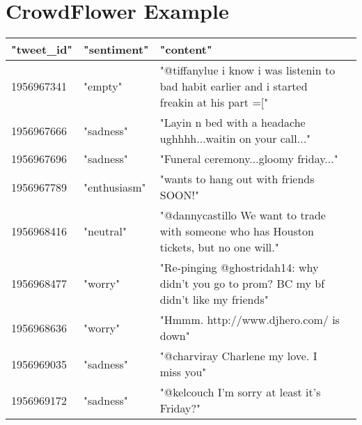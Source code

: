 \section{CrowdFlower Example}\label{sec:CrowdFlower_example}

\begin{landscape}
  \begin{table}
      \centering
      \begin{tabular}{|l|l|l|l}
      \hline
          "tweet_id" & "sentiment" & "content" \\ \hline

          1956967341 & "empty" & "@tiffanylue i know  i was listenin to bad habit earlier and i started freakin at his part =[" \\
          1956967666 & "sadness" & "Layin n bed with a headache  ughhhh...waitin on your call..." \\
          1956967696 & "sadness" & "Funeral ceremony...gloomy friday..." \\
          1956967789 & "enthusiasm" & "wants to hang out with friends SOON!" \\
          1956968416 & "neutral" & "@dannycastillo We want to trade with someone who has Houston tickets, but no one will." \\
          1956968477 & "worry" & "Re-pinging @ghostridah14: why didn't you go to prom? BC my bf didn't like my friends" \\
          1956968636 & "worry" & "Hmmm. http://www.djhero.com/ is down" \\
          1956969035 & "sadness" & "@charviray Charlene my love. I miss you" \\
          1956969172 & "sadness" & "@kelcouch I'm sorry  at least it's Friday?" \\
          \hline
      \end{tabular}
  \end{table}
\end{landscape}


